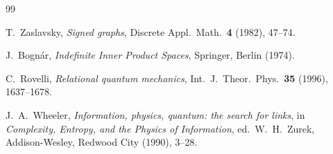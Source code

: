 \documentclass[11pt]{article}
\theoremstyle{definition}
\theoremstyle{remark}
\begin{document}
\begin{thebibliography}{99}

T.~Zaslavsky,
\emph{Signed graphs},
Discrete Appl.\ Math.\ \textbf{4} (1982), 47--74.

J.~Bogn\'ar,
\emph{Indefinite Inner Product Spaces},
Springer, Berlin (1974).


C.~Rovelli,
\emph{Relational quantum mechanics},
Int.\ J.\ Theor.\ Phys.\ \textbf{35} (1996), 1637--1678.

J.~A.~Wheeler,
\emph{Information, physics, quantum: the search for links},
in \emph{Complexity, Entropy, and the Physics of Information},
ed.\ W.~H.~Zurek, Addison-Wesley, Redwood City (1990), 3--28.
\end{thebibliography}
\end{document}
